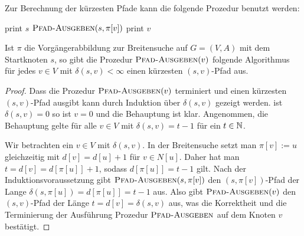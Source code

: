 \begin{bem}Zur Berechnung der kürzesten Pfade kann die folgende Prozedur benutzt werden: 
	\begin{algorithm}[H]
	\caption{$\cc{Pfad-Ausgeben}(v)$}
	\begin{algorithmic}[1]
		\STATE print $s$
		\ELSE
		\STATE $\mathop{\text{\textsc{Pfad-Ausgeben}}}(s,\pi[v])$
		\STATE print $v$
		\ENDIF
	\end{algorithmic}
\end{algorithm}
\end{bem}

\begin{prop}
	Ist $\pi$ die Vorgängerabbildung zur Breitensuche auf $G=(V,A)$ mit dem Startknoten $s$, so gibt die Prozedur $\cc{Pfad-Ausgeben}(v)$ folgende Algorithmus für jedes $v \in V$ mit $\delta(s,v)<\infty$ einen kürzesten $(s,v)$-Pfad aus. 
\end{prop}
\begin{proof} 
 Dass die Prozedur $\cc{Pfad-Ausgeben}(v)$ terminiert und einen kürzesten $(s,v)$-Pfad ausgibt kann durch Induktion über $\delta(s,v)$ gezeigt werden. ist $\delta(s,v)=0$ so ist $v=0$ und die Behauptung ist klar. Angenommen, die Behauptung gelte für alle $v \in V$ mit $\delta(s,v)=t-1$ für ein $t \in \mathbb{N}$. 

Wir betrachten ein $v \in V$ mit $\delta(s,v)$. 	In der Breitensuche setzt man  $\pi[v] := u$ gleichzeitig mit $d[v] = d[u]+1$ für $v \in N[u]$. Daher hat man $t = d[v] = d[\pi[u]] + 1 $, sodass $d[\pi[u]]=t-1$ gilt. Nach der Induktionsvoraussetzung  gibt $\mathop{\text{\textsc{Pfad-Ausgeben}}}(s,\pi[v])$ den $(s,\pi[v])$-Pfad der Lange $\delta(s,\pi[u]) = d[\pi[u]]  = t-1$ aus. Also gibt $\cc{Pfad-Ausgeben}(v)$ den $(s,v)$-Pfad der Länge $t = d[v] = \delta(s,v)$ aus, was die Korrektheit und die Terminierung der Ausführung Prozedur $\mathop{\text{\textsc{Pfad-Ausgeben}}}$  auf dem Knoten $v$ bestätigt. 
\end{proof} 



